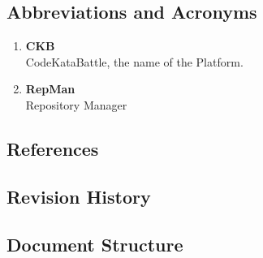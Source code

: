 \subsection{Abbreviations and Acronyms}
\begin{enumerate}[label=$\bullet$]
    \item \textbf{CKB}\\CodeKataBattle, the name of the Platform.
    \item \textbf{RepMan}\\Repository Manager
\end{enumerate}
\subsection{References}
\subsection{Revision History}
\subsection{Document Structure}

\newpage
%